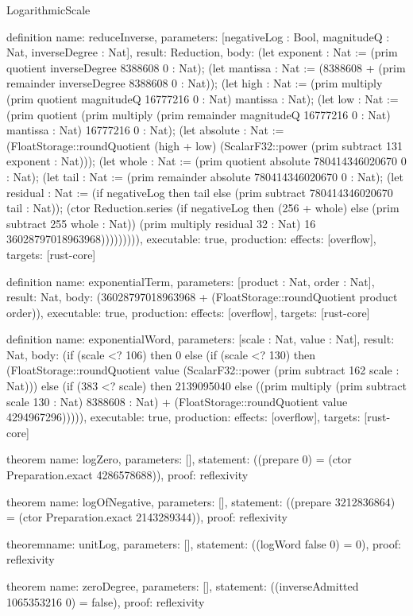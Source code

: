 \begin{lexlean}{LogarithmicScale}
\begin{semanticmodule}
definition{
  name: reduceInverse,
  parameters: [negativeLog : Bool, magnitudeQ : Nat, inverseDegree : Nat],
  result: Reduction,
  body: (let exponent : Nat := (prim quotient inverseDegree 8388608 0 : Nat); (let mantissa : Nat := (8388608 + (prim remainder inverseDegree 8388608 0 : Nat)); (let high : Nat := (prim multiply (prim quotient magnitudeQ 16777216 0 : Nat) mantissa : Nat); (let low : Nat := (prim quotient (prim multiply (prim remainder magnitudeQ 16777216 0 : Nat) mantissa : Nat) 16777216 0 : Nat); (let absolute : Nat := (FloatStorage::roundQuotient (high + low) (ScalarF32::power (prim subtract 131 exponent : Nat))); (let whole : Nat := (prim quotient absolute 780414346020670 0 : Nat); (let tail : Nat := (prim remainder absolute 780414346020670 0 : Nat); (let residual : Nat := (if negativeLog then tail else (prim subtract 780414346020670 tail : Nat)); (ctor Reduction.series (if negativeLog then (256 + whole) else (prim subtract 255 whole : Nat)) (prim multiply residual 32 : Nat) 16 36028797018963968))))))))),
  executable: true,
  production: {effects: [overflow], targets: [rust-core]}
}

definition{
  name: exponentialTerm,
  parameters: [product : Nat, order : Nat],
  result: Nat,
  body: (36028797018963968 + (FloatStorage::roundQuotient product order)),
  executable: true,
  production: {effects: [overflow], targets: [rust-core]}
}

definition{
  name: exponentialWord,
  parameters: [scale : Nat, value : Nat],
  result: Nat,
  body: (if (scale <? 106) then 0 else (if (scale <? 130) then (FloatStorage::roundQuotient value (ScalarF32::power (prim subtract 162 scale : Nat))) else (if (383 <? scale) then 2139095040 else ((prim multiply (prim subtract scale 130 : Nat) 8388608 : Nat) + (FloatStorage::roundQuotient value 4294967296))))),
  executable: true,
  production: {effects: [overflow], targets: [rust-core]}
}

theorem{
  name: logZero,
  parameters: [],
  statement: ((prepare 0) = (ctor Preparation.exact 4286578688)),
  proof: reflexivity{}
}

theorem{
  name: logOfNegative,
  parameters: [],
  statement: ((prepare 3212836864) = (ctor Preparation.exact 2143289344)),
  proof: reflexivity{}
}

theorem{name: unitLog, parameters: [], statement: ((logWord false 0) = 0), proof: reflexivity{}}

theorem{
  name: zeroDegree,
  parameters: [],
  statement: ((inverseAdmitted 1065353216 0) = false),
  proof: reflexivity{}
}
\end{semanticmodule}
\end{lexlean}
